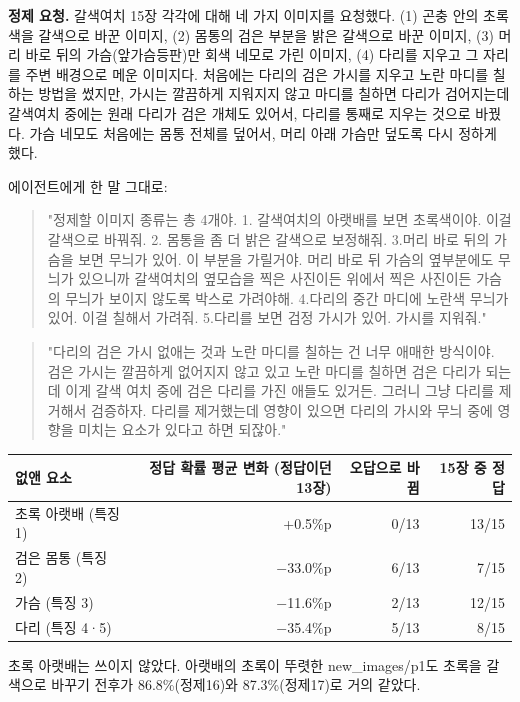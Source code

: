 \documentclass[11pt]{article}
\begin{document}
\textbf{정제 요청.} 갈색여치 15장 각각에 대해 네 가지 이미지를 요청했다. (1) 곤충 안의 초록색을 갈색으로 바꾼 이미지, (2) 몸통의 검은 부분을 밝은 갈색으로 바꾼 이미지, (3) 머리 바로 뒤의 가슴(앞가슴등판)만 회색 네모로 가린 이미지, (4) 다리를 지우고 그 자리를 주변 배경으로 메운 이미지다. 처음에는 다리의 검은 가시를 지우고 노란 마디를 칠하는 방법을 썼지만, 가시는 깔끔하게 지워지지 않고 마디를 칠하면 다리가 검어지는데 갈색여치 중에는 원래 다리가 검은 개체도 있어서, 다리를 통째로 지우는 것으로 바꿨다. 가슴 네모도 처음에는 몸통 전체를 덮어서, 머리 아래 가슴만 덮도록 다시 정하게 했다.

에이전트에게 한 말 그대로:
\begin{quote}
"정제할 이미지 종류는 총 4개야. 1. 갈색여치의 아랫배를 보면 초록색이야. 이걸 갈색으로 바꿔줘. 2. 몸통을 좀 더 밝은 갈색으로 보정해줘. 3.머리 바로 뒤의 가슴을 보면 무늬가 있어. 이 부분을 가릴거야. 머리 바로 뒤 가슴의 옆부분에도 무늬가 있으니까 갈색여치의 옆모습을 찍은 사진이든 위에서 찍은 사진이든 가슴의 무늬가 보이지 않도록 박스로 가려야해. 4.다리의 중간 마디에 노란색 무늬가 있어. 이걸 칠해서 가려줘. 5.다리를 보면 검정 가시가 있어. 가시를 지워줘."
\end{quote}
\begin{quote}
"다리의 검은 가시 없애는 것과 노란 마디를 칠하는 건 너무 애매한 방식이야. 검은 가시는 깔끔하게 없어지지 않고 있고 노란 마디를 칠하면 검은 다리가 되는데 이게 갈색 여치 중에 검은 다리를 가진 애들도 있거든. 그러니 그냥 다리를 제거해서 검증하자. 다리를 제거했는데 영향이 있으면 다리의 가시와 무늬 중에 영향을 미치는 요소가 있다고 하면 되잖아."
\end{quote}

\begin{center}\footnotesize
\begin{tabular}{lrrr}
\toprule
없앤 요소 & 정답 확률 평균 변화 (정답이던 13장) & 오답으로 바뀜 & 15장 중 정답 \\
\midrule
초록 아랫배 (특징 1) & +0.5\%p & 0/13 & 13/15 \\
검은 몸통 (특징 2) & $-$33.0\%p & 6/13 & 7/15 \\
가슴 (특징 3) & $-$11.6\%p & 2/13 & 12/15 \\
다리 (특징 4·5) & $-$35.4\%p & 5/13 & 8/15 \\
\bottomrule
\end{tabular}
\end{center}

초록 아랫배는 쓰이지 않았다. 아랫배의 초록이 뚜렷한 new\_images/p1도 초록을 갈색으로 바꾸기 전후가 86.8\%(정제16)와 87.3\%(정제17)로 거의 같았다.
\end{document}
